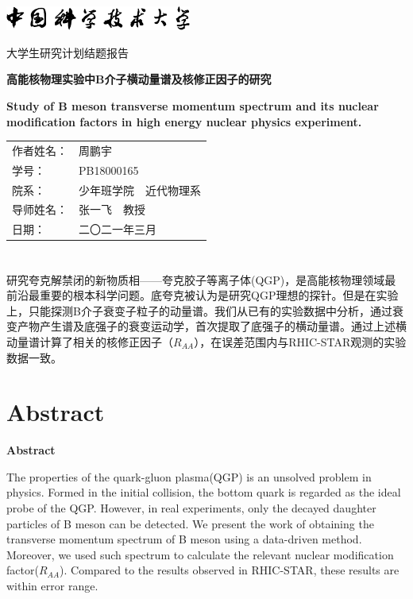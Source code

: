 \documentclass[12pt, a4paper]{ctexart}
\makeatletter
\renewenvironment{abstract}{%
    \if@twocolumn
      \section*{\abstractname}%
    \else %
      \begin{center}%
        {\bfseries \large\abstractname\vspace{\z@}}%
      \end{center}%
      \quotation
    \fi}
    {\if@twocolumn\else\endquotation\fi}
\makeatother
\begin{document}
\begin{titlepage}%
    \centering
    \includegraphics[height=0.8cm]{figures/ustc-name.pdf}\par
    {\sffamily\fontsize{20\bp@}{20\bp@}\selectfont
      大学生研究计划结题报告\par}%
    \parbox[t][1.5cm][c]{\textwidth}{%
      \centering\sffamily\bfseries\fontsize{15\bp@}{15\bp@}\selectfont
      高能核物理实验中B介子横动量谱及核修正因子的研究\par}
      \parbox[t][3cm][t]{\textwidth}{%
      \centering\sffamily\bfseries\fontsize{12\bp@}{12\bp@}\selectfont
      Study of B meson transverse momentum spectrum and its nuclear modification factors in high energy nuclear physics experiment.\par\par}

    {\fontsize{12\bp@}{12\bp@}\selectfont
      \begin{tabular}{ll}%
        \textsf{作者姓名：} & 周鹏宇 \\
        \textsf{学号：} & PB18000165\\
        \textsf{院系：} & 少年班学院~~近代物理系\\
          \textsf{导师姓名：} & 张一飞~~教授 \\
          \textsf{日期：} & 二〇二一年三月 \\
      \end{tabular}\par}%
\begin{abstract}
研究夸克解禁闭的新物质相——夸克胶子等离子体(QGP)，是高能核物理领域最前沿最重要的根本科学问题。底夸克被认为是研究QGP理想的探针。但是在实验上，只能探测B介子衰变子粒子的动量谱。我们从已有的实验数据中分析，通过衰变产物产生谱及底强子的衰变运动学，首次提取了底强子的横动量谱。通过上述横动量谱计算了相关的核修正因子（$R_{AA}$），在误差范围内与RHIC-STAR观测的实验数据一致。

\end{abstract}

\renewcommand{\abstractname}{Abstract}

\begin{abstract}
	The properties of the quark-gluon plasma(QGP) is an unsolved problem in physics. Formed in the initial collision, the bottom quark is regarded as the ideal probe of the QGP. However, in real experiments, only the decayed daughter particles of B meson can be detected. We present the work of obtaining the transverse momentum spectrum of B meson using a data-driven method. Moreover, we used such spectrum to calculate the relevant nuclear modification factor($R_{AA}$). Compared to the results observed in RHIC-STAR, these results are within error range.
\end{abstract}
\end{titlepage}%
\end{document}
